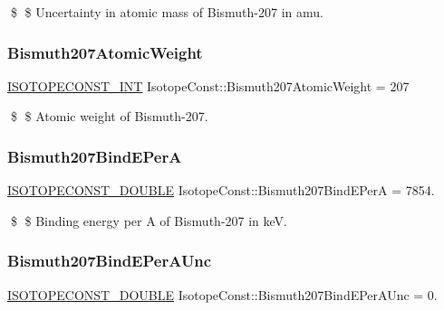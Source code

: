 \$ \$ Uncertainty in atomic mass of Bismuth-\/207 in amu. \mbox{\label{group___isotope_const-_bismuth-_bi207_gac82aaa54d611249828322051eef21c1a}} 
\subsubsection{\texorpdfstring{Bismuth207\+Atomic\+Weight}{Bismuth207AtomicWeight}}
{\footnotesize\ttfamily \mbox{\hyperlink{group___isotope_const-_macros_ga5f18360b3e99483a35c32d789e62621c}{I\+S\+O\+T\+O\+P\+E\+C\+O\+N\+S\+T\+\_\+\+I\+NT}} Isotope\+Const\+::\+Bismuth207\+Atomic\+Weight = 207}

\$ \$ Atomic weight of Bismuth-\/207. \mbox{\label{group___isotope_const-_bismuth-_bi207_ga86132f65969cb141a949d11aefd9e315}} 
\subsubsection{\texorpdfstring{Bismuth207\+Bind\+E\+PerA}{Bismuth207BindEPerA}}
{\footnotesize\ttfamily \mbox{\hyperlink{group___isotope_const-_macros_ga8f45a7272ce02c0b4c65c44636ed719a}{I\+S\+O\+T\+O\+P\+E\+C\+O\+N\+S\+T\+\_\+\+D\+O\+U\+B\+LE}} Isotope\+Const\+::\+Bismuth207\+Bind\+E\+PerA = 7854.}

\$ \$ Binding energy per A of Bismuth-\/207 in keV. \mbox{\label{group___isotope_const-_bismuth-_bi207_ga676549061ec5fd2b9d1e8c3798ebc99e}} 
\subsubsection{\texorpdfstring{Bismuth207\+Bind\+E\+Per\+A\+Unc}{Bismuth207BindEPerAUnc}}
{\footnotesize\ttfamily \mbox{\hyperlink{group___isotope_const-_macros_ga8f45a7272ce02c0b4c65c44636ed719a}{I\+S\+O\+T\+O\+P\+E\+C\+O\+N\+S\+T\+\_\+\+D\+O\+U\+B\+LE}} Isotope\+Const\+::\+Bismuth207\+Bind\+E\+Per\+A\+Unc = 0.}

